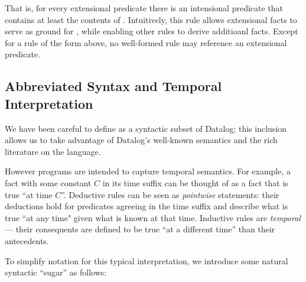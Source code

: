 
That is, for every extensional predicate  there is an intensional
predicate  that contains at least the contents of .
Intuitively, this rule allows extensional facts to serve as ground for
, while enabling other rules to derive additioanl  facts.
Except for a rule of the form above, no well-formed \slang rule may reference
an extensional predicate. 


\subsection{Abbreviated Syntax and Temporal Interpretation}
\label{sec:abbrvsyntax}

We have been careful to define \slang as a syntactic subset of Datalog; this inclusion allows us to take advantage of Datalog's
well-known semantics and the rich literature on the language.

However \slang programs are intended to capture 
temporal semantics.  For example, a fact with some constant $C$ in its time
suffix can be thought of as a fact that is true ``at time $C$''.  
Deductive rules can be seen as {\em pointwise} statements: their deductions hold for 
predicates agreeing in the time suffix and describe what is true ``at any time" given 
what is known at that time.
 Inductive %
 rules are {\em temporal} --- their consequents are defined to
be true ``at a different time'' than their antecedents. 



To simplify \slang notation for this typical interpretation,  we introduce
some natural syntactic ``sugar'' as follows:

